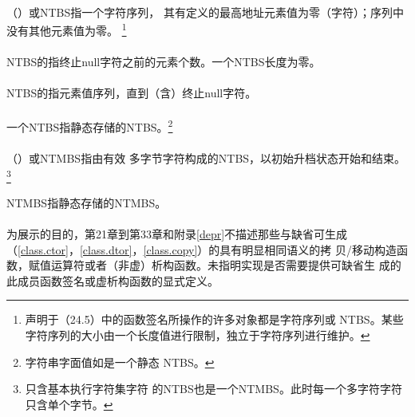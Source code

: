 \paragraph{}
（）或NTBS指一个字符序列，
其有定义的最高地址元素值为零（字符）；序列中没有其他元素值为零。
\footnote{声明于（24.5）中的函数签名所操作的许多对象都是字符序列或
NTBS。某些字符序列的大小由一个长度值进行限制，独立于字符序列进行维护。}

\paragraph{}
NTBS的指终止null字符之前的元素个数。一个NTBS长度为零。

\paragraph{}
NTBS的指元素值序列，直到（含）终止null字符。

\paragraph{}
一个NTBS指静态存储的NTBS。\footnote{字符串字面值如是一个静态
NTBS。}

\paragraph{}
（）或NTMBS指由有效
多字节字符构成的NTBS，以初始升档状态开始和结束。\footnote{只含基本执行字符集字符
的NTBS也是一个NTMBS。此时每一个多字符字符只含单个字节。}

\paragraph{}
NTMBS指静态存储的NTMBS。

\paragraph{}
为展示的目的，第21章到第33章和附录\ref{depr}不描述那些与缺省可生成
（\ref{class.ctor}，\ref{class.dtor}，\ref{class.copy}）的具有明显相同语义的拷
贝/移动构造函数，赋值运算符或者（非虚）析构函数。未指明实现是否需要提供可缺省生
成的此成员函数签名或虚析构函数的显式定义。

